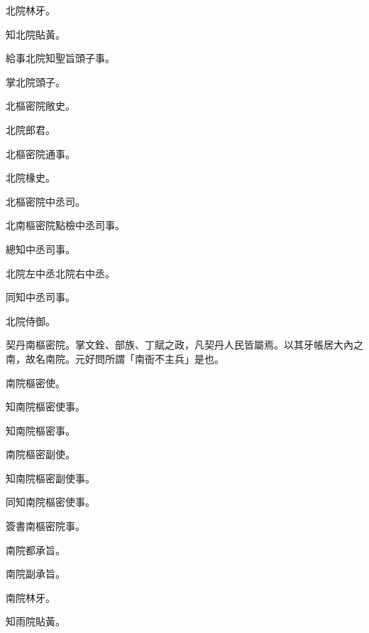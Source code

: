 \begin{pinyinscope}
 北院林牙。



 知北院貼黃。



 給事北院知聖旨頭子事。



 掌北院頭子。



 北樞密院敞史。



 北院郎君。



 北樞密院通事。



 北院椽史。



 北樞密院中丞司。



 北南樞密院點檢中丞司事。



 總知中丞司事。



 北院左中丞北院右中丞。



 同知中丞司事。



 北院侍御。



 契丹南樞密院。掌文銓、部族、丁賦之政，凡契丹人民皆屬焉。以其牙帳居大內之南，故名南院。元好問所謂「南衙不主兵」是也。



 南院樞密使。



 知南院樞密使事。



 知南院樞密事。



 南院樞密副使。



 知南院樞密副使事。



 同知南院樞密使事。



 簽書南樞密院事。



 南院都承旨。



 南院副承旨。



 南院林牙。



 知雨院貼黃。




\end{pinyinscope}
